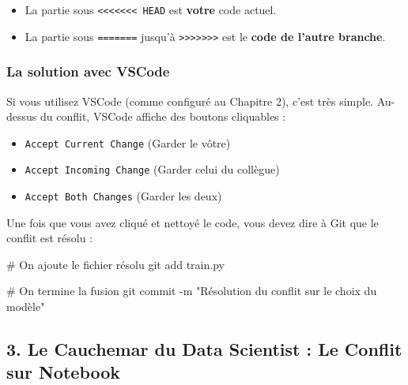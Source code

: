\documentclass[
  letterpaper,
  DIV=11,
  numbers=noendperiod]{scrreprt}
\newenvironment{Shaded}{\begin{snugshade}}{\end{snugshade}}
\newcommand{\AttributeTok}[1]{\textcolor[rgb]{0.40,0.45,0.13}{#1}}
\newcommand{\CommentTok}[1]{\textcolor[rgb]{0.37,0.37,0.37}{#1}}
\newcommand{\FunctionTok}[1]{\textcolor[rgb]{0.28,0.35,0.67}{#1}}
\newcommand{\NormalTok}[1]{\textcolor[rgb]{0.00,0.23,0.31}{#1}}
\newcommand{\StringTok}[1]{\textcolor[rgb]{0.13,0.47,0.30}{#1}}
\providecommand{\tightlist}{%
  \setlength{\itemsep}{0pt}\setlength{\parskip}{0pt}}
\begin{document}
\begin{itemize}
\tightlist
\item
  La partie sous
  \texttt{\textless{}\textless{}\textless{}\textless{}\textless{}\textless{}\textless{}\ HEAD}
  est \textbf{votre} code actuel.
\item
  La partie sous \texttt{=======} jusqu'à
  \texttt{\textgreater{}\textgreater{}\textgreater{}\textgreater{}\textgreater{}\textgreater{}\textgreater{}}
  est le \textbf{code de l'autre branche}.
\end{itemize}

\subsubsection{La solution avec VSCode}\label{la-solution-avec-vscode}

Si vous utilisez VSCode (comme configuré au Chapitre 2), c'est très
simple. Au-dessus du conflit, VSCode affiche des boutons cliquables :

\begin{itemize}
\item
  \texttt{Accept\ Current\ Change} (Garder le vôtre)
\item
  \texttt{Accept\ Incoming\ Change} (Garder celui du collègue)
\item
  \texttt{Accept\ Both\ Changes} (Garder les deux)
\end{itemize}

Une fois que vous avez cliqué et nettoyé le code, vous devez dire à Git
que le conflit est résolu :

\begin{Shaded}
\begin{Highlighting}[]
\CommentTok{\# On ajoute le fichier résolu}
\FunctionTok{git}\NormalTok{ add train.py}

\CommentTok{\# On termine la fusion}
\FunctionTok{git}\NormalTok{ commit }\AttributeTok{{-}m} \StringTok{"Résolution du conflit sur le choix du modèle"}
\end{Highlighting}
\end{Shaded}

\subsection{3. Le Cauchemar du Data Scientist : Le Conflit sur
Notebook}\label{le-cauchemar-du-data-scientist-le-conflit-sur-notebook}
\end{document}
